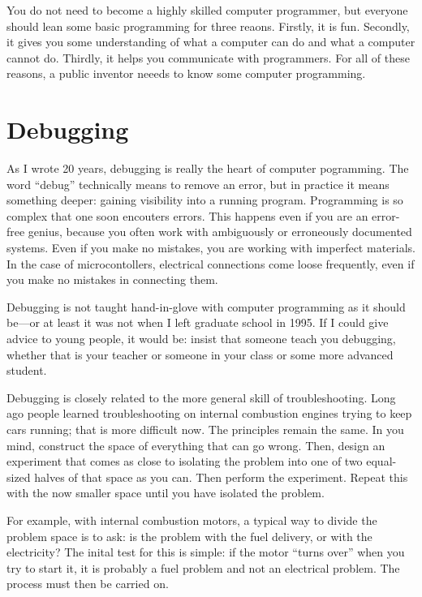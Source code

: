 \documentclass[
	fontsize=10pt, %
	twoside=false, %
	secnumdepth=1, %
]{kaobook}
\begin{document}
You do not need to
become a highly skilled computer programmer, but
everyone should lean some basic programming for three reaons.
Firstly, it is fun.
Secondly, it gives you some understanding of what a computer
can do and what a computer cannot do.
Thirdly, it helps you communicate with programmers.
For all of these reasons, a public inventor neeeds to know
some computer programming.

\section{Debugging}

As I wrote 20 years\cite{HowToBeAProgrammer}, debugging
is really the heart of computer pogramming.
The word ``debug'' technically means to remove an error,
but in practice it means something deeper: gaining visibility
into a running program. Programming is so complex that one soon
encouters errors. This happens even if you are an error-free genius,
because you often work with ambiguously or erroneously documented systems.
Even if you make no mistakes, you are working with imperfect materials.
In the case of microcontollers, electrical connections come loose
frequently, even if you make no mistakes in connecting them.

Debugging is not taught hand-in-glove with computer programming
as it should be---or at least it was not when I left graduate school in 1995.
If I could give advice to young people, it would be: insist that someone
teach you debugging, whether that is your teacher or someone in your class
or some more advanced student.

Debugging is closely related to the more general skill of troubleshooting.
Long ago people learned troubleshooting on internal combustion engines
trying to keep cars running; that is more difficult now. The principles
remain the same. In you mind, construct the space of everything that can
go wrong. Then, design an experiment that comes as close to isolating the
problem into one of two equal-sized halves of that space as you can.
Then perform the experiment. Repeat this with the now smaller space until
you have isolated the problem.

For example, with internal combustion motors, a typical way to divide the problem space is
to ask: is the problem with the fuel delivery, or with the electricity?
The inital test for this is simple: if the motor ``turns over'' when you try to start it,
it is probably a fuel problem and not an electrical problem.  The process must then be carried on.
\end{document}
